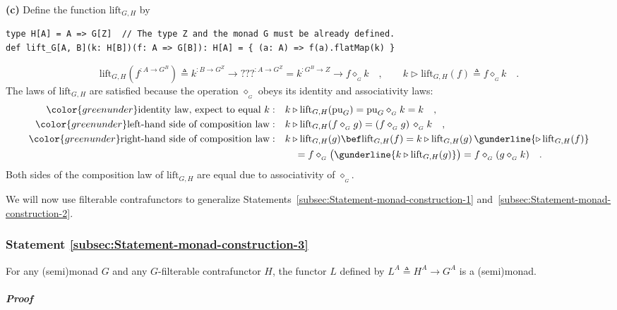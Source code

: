 \textbf{(c)} Define the function $\text{lift}_{G,H}$ by
\begin{lstlisting}
type H[A] = A => G[Z]  // The type Z and the monad G must be already defined.
def lift_G[A, B](k: H[B])(f: A => G[B]): H[A] = { (a: A) => f(a).flatMap(k) }
\end{lstlisting}
\[
\text{lift}_{G,H}(f^{:A\rightarrow G^{B}})\triangleq k^{:B\rightarrow G^{Z}}\rightarrow\text{???}^{:A\rightarrow G^{Z}}=k^{:G^{B}\rightarrow Z}\rightarrow f\diamond_{_{G}}k\quad,\quad\quad k\triangleright\text{lift}_{G,H}(f)\triangleq f\diamond_{_{G}}k\quad.
\]
The laws of $\text{lift}_{G,H}$ are satisfied because the operation
$\diamond_{_{G}}$ obeys its identity and associativity laws:
\begin{align*}
{\color{greenunder}\text{identity law, expect to equal }k:}\quad & k\triangleright\text{lift}_{G,H}(\text{pu}_{G})=\text{pu}_{G}\diamond_{_{G}}k=k\quad,\\
{\color{greenunder}\text{left-hand side of composition law}:}\quad & k\triangleright\text{lift}_{G,H}(f\diamond_{_{G}}g)=(f\diamond_{_{G}}g)\,\diamond_{_{G}}k\quad,\\
{\color{greenunder}\text{right-hand side of composition law}:}\quad & k\triangleright\text{lift}_{G,H}(g)\bef\text{lift}_{G,H}(f)=k\triangleright\text{lift}_{G,H}(g)\,\gunderline{\triangleright\,\text{lift}_{G,H}(f)}\\
 & \quad=f\diamond_{_{G}}\big(\gunderline{k\triangleright\text{lift}_{G,H}(g)}\big)=f\diamond_{_{G}}(g\diamond_{_{G}}k)\quad.
\end{align*}
Both sides of the composition law of $\text{lift}_{G,H}$ are equal
due to associativity of $\diamond_{_{G}}$.

We will now use filterable contrafunctors to generalize Statements~\ref{subsec:Statement-monad-construction-1}
and~\ref{subsec:Statement-monad-construction-2}.

\subsubsection{Statement \label{subsec:Statement-monad-construction-3}\ref{subsec:Statement-monad-construction-3}}

For any (semi)monad $G$ and any $G$-filterable contrafunctor $H$,
the functor $L$ defined by $L^{A}\triangleq H^{A}\rightarrow G^{A}$
is a (semi)monad.

\subparagraph{Proof}

